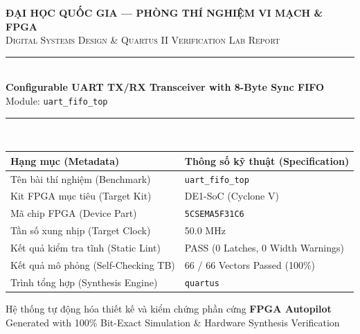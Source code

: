 \documentclass[11pt,a4paper]{article}
\begin{document}
\begin{titlepage}

    \centering
    \vspace*{1.6cm}
    {\Large\bfseries\textcolor{deepblue}{ĐẠI HỌC QUỐC GIA — PHÒNG THÍ NGHIỆM VI MẠCH \& FPGA}\\[0.3cm]}
    {\large\textsc{Digital Systems Design \& Quartus II Verification Lab Report}}\\[1.2cm]

    \rule{0.82\textwidth}{1.2pt}\\[0.5cm]
    {\huge\bfseries\textcolor{deepblue}{Configurable UART TX/RX Transceiver with 8-Byte Sync FIFO}}\\[0.4cm]
    {\Large Module: \texttt{uart\_fifo\_top}}\\[0.4cm]
    \rule{0.82\textwidth}{1.2pt}\\[1.4cm]

    \begin{tabularx}{0.84\textwidth}{@{}lX@{}}
        \toprule
        \textbf{Hạng mục (Metadata)} & \textbf{Thông số kỹ thuật (Specification)} \\
        \midrule
        Tên bài thí nghiệm (Benchmark) & \texttt{uart\_fifo\_top} \\
        Kit FPGA mục tiêu (Target Kit) & DE1-SoC (Cyclone V) \\
        Mã chip FPGA (Device Part) & \texttt{5CSEMA5F31C6} \\
        Tần số xung nhịp (Target Clock) & 50.0 MHz \\
        Kết quả kiểm tra tĩnh (Static Lint) & PASS (0 Latches, 0 Width Warnings) \\
        Kết quả mô phỏng (Self-Checking TB) & 66 / 66 Vectors Passed (100\%) \\
        Trình tổng hợp (Synthesis Engine) & \texttt{quartus} \\
        \bottomrule
    \end{tabularx}

    \vfill
    {\normalsize Hệ thống tự động hóa thiết kế và kiểm chứng phần cứng \textbf{FPGA Autopilot}}\\[0.2cm]
    {\small Generated with 100\% Bit-Exact Simulation \& Hardware Synthesis Verification}
    \vspace*{1.2cm}
\end{titlepage}
\end{document}
